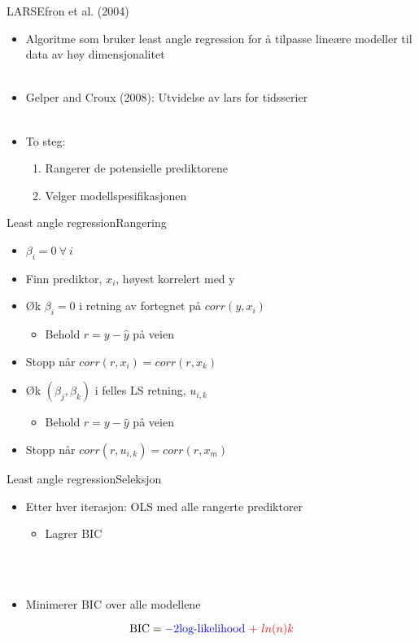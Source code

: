 \documentclass{beamer}
\begin{document}
\begin{frame}{LARS}{Efron et al. (2004)}
	\begin{itemize}
		\item Algoritme som bruker least angle regression for å tilpasse lineære modeller til data av høy dimensjonalitet \\~\\
		\item Gelper and Croux (2008): Utvidelse av lars for tidsserier \\~\\
		\item To steg:
			\begin{enumerate}
			\item Rangerer de potensielle prediktorene
			\item Velger modellspesifikasjonen
			\end{enumerate}
	\end{itemize}
\end{frame}


\begin{frame}{Least angle regression}{Rangering}
	\begin{itemize}
		\item $\beta_{i} = 0 \ \forall \ i$
		\item Finn prediktor, $x_i$, høyest korrelert med y
		\item Øk $\beta_{i} = 0$ i retning av fortegnet på $corr(y, x_i)$
			\begin{itemize}
				\item Behold $r = y - \hat{y}$ på veien
			\end{itemize}
		\item Stopp når $corr(r,x_i) = corr(r,x_k)$
		\item Øk $(\beta_j, \beta_k)$ i felles LS retning, $u_{i,k}$
			\begin{itemize}
				\item Behold $r = y - \hat{y}$ på veien
			\end{itemize}
		\item Stopp når $corr(r,u_{i,k}) = corr(r,x_m)$
	\end{itemize}
\end{frame}


\begin{frame}{Least angle regression}{Seleksjon}
	\begin{itemize}
		\item Etter hver iterasjon: OLS med alle rangerte prediktorer
			\begin{itemize}
				\item Lagrer BIC
			\end{itemize} \ \\~\\
		\item Minimerer BIC over alle modellene
	\end{itemize}
	
	$$ \text{BIC} = \color{blue}{-2 \text{log-likelihood}} \ \color{red}{+} \ \color{red}{ln(n) k}$$
\end{frame}
\end{document}
